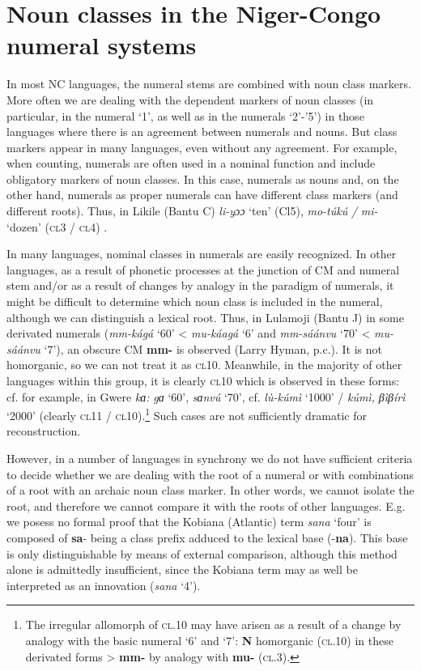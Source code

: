 \chapter{Noun classes in the Niger-Congo numeral systems} \label{sec:1}
In most NC languages, the numeral stems are combined with noun class markers. More often we are dealing with the dependent markers of noun classes (in particular, in the numeral `1', as well as in the numerals `2'-'5') in those languages where there is an agreement between numerals and nouns. But class markers appear in many languages, ​​even without any agreement. For example, when counting, numerals are often used in a nominal function and include obligatory markers of noun classes. In this case, numerals as nouns and, on the other hand, numerals as proper numerals can have different class markers (and different roots). Thus, in Likile (Bantu C) \textit{li-yɔɔ} `ten' (Cl5), \textit{mo-túkú} \textit{/} \textit{mi-} {`dozen'} (\textsc{cl}3 / \textsc{cl}4) \citep{Carrington1977}.

In many languages, nominal classes in numerals are easily recognized. In other languages, as a result of phonetic processes at the junction of CM and numeral stem and/or as a result of changes by analogy in the paradigm of numerals, it might be difficult to determine which noun class is included in the numeral, although we can distinguish a lexical root. Thus, in Lulamoji (Bantu J) in some derivated numerals (\textit{mm-kágá} `60' < \textit{mu-káagá} `6' and \textit{mm-sáánvu} `70' < \textit{mu-sáánvu} `7'), an obscure CM \textbf{mm-} is observed (Larry Hyman, p.c.). It is not homorganic, so we can not treat it as \textsc{cl}10. Meanwhile, in the majority of other languages within this group, it is clearly \textsc{cl}10 which is observed in these forms: cf. for example, in Gwere \textit{{}kɑ:} \textit{gɑ} `60', \textit{{}sɑnvú} `70', cf. \textit{lù-kúmì} `1000' / \textit{{}kúmì, } \textit{βìβírì} `2000' (clearly \textsc{cl}11 / \textsc{cl}10).\footnote{The irregular allomorph of \textsc{cl}.10 may have arisen as a result of a change by analogy with the basic numeral `6' and `7': \textbf{N} homorganic (\textsc{cl}.10) in these derivated forms > \textbf{mm-} by analogy with \textbf{mu-} (\textsc{cl}.3).} Such cases are not sufficiently dramatic for reconstruction.

However, in a number of languages in synchrony we do not have sufficient criteria to decide whether we are dealing with the root of a numeral or with combinations of a root with an archaic noun class marker. In other words, we cannot isolate the root, and therefore we cannot compare it with the roots of other languages. E.g. we posess no formal proof that the Kobiana (Atlantic) term \textit{sana} ‘four’ is composed of \textbf{sa}- being a class prefix adduced to the lexical base (-\textbf{na}). This base is only distinguishable by means of external comparison, although this method alone is admittedly  insufficient, since the Kobiana term may as well be interpreted as an innovation (\textit{sana} ‘4’). 

